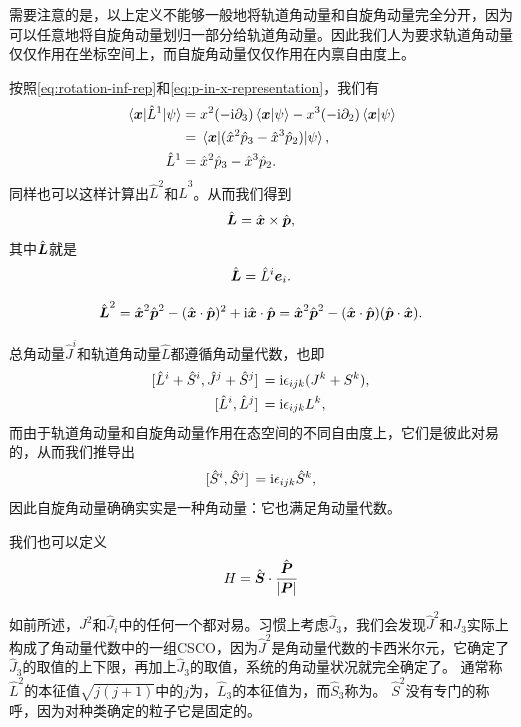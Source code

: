 需要注意的是，以上定义不能够一般地将轨道角动量和自旋角动量完全分开，因为可以任意地将自旋角动量划归一部分给轨道角动量。因此我们人为要求轨道角动量仅仅作用在坐标空间上，而自旋角动量仅仅作用在内禀自由度上。

按照\eqref{eq:rotation-inf-rep}和\eqref{eq:p-in-x-representation}，我们有
\[
    \begin{aligned}
        \mel{\vb*{x}}{\hat{L}^1}{\psi} &= x^2 (- \mathrm{i} \partial_3) \braket{\vb*{x}}{\psi} - x^3 (- \mathrm{i} \partial_2) \braket{\vb*{x}}{\psi} \\
        &= \mel{\vb*{x}}{(\hat{x}^2 \hat{p}_3 - \hat{x}^3 \hat{p}_2)}{\psi}, \\
        \hat{L}^1 &= \hat{x}^2 \hat{p}_3 - \hat{x}^3 \hat{p}_2.
    \end{aligned}
\]
同样也可以这样计算出$\hat{L}^2$和$\hat{L}^3$。从而我们得到
\begin{equation}
    \hat{\vb*{L}} = \hat{\vb*{x}} \times \hat{\vb*{p}},
\end{equation}
其中$\hat{\vb*{L}}$就是
\begin{equation}
    \hat{\vb*{L}} = \hat{L}^i \vb*{e}_i.
\end{equation}

\begin{equation}
    \hat{\vb*{L}}^2 = \hat{\vb*{x}}^2 \hat{\vb*{p}}^2 - (\hat{\vb*{x}} \cdot \hat{\vb*{p}})^2 + \mathrm{i} \hat{\vb*{x}} \cdot \hat{\vb*{p}} = \hat{\vb*{x}}^2 \hat{\vb*{p}}^2 - (\hat{\vb*{x}} \cdot \hat{\vb*{p}}) (\hat{\vb*{p}} \cdot \hat{\vb*{x}}).
\end{equation}

总角动量$\hat{J}^i$和轨道角动量$\hat{L}$都遵循角动量代数，也即
\[
    \begin{aligned}
        \comm*{\hat{L}^i+\hat{S}^i}{\hat{J}^j+\hat{S}^j} &= \ii \epsilon_{ijk} (J^k+S^k), \\
        \comm*{\hat{L}^i}{\hat{L}^j} &= \ii \epsilon_{ijk} L^k,
    \end{aligned}
\]
而由于轨道角动量和自旋角动量作用在态空间的不同自由度上，它们是彼此对易的，从而我们推导出
\[
    \comm*{\hat{S}^i}{\hat{S}^j} = \ii \epsilon_{ijk} \hat{S}^k,
\]
因此自旋角动量确确实实是一种角动量：它也满足角动量代数。

我们也可以定义
\begin{equation}
    H = \hat{\vb*{S}} \cdot \frac{\hat{\vb*{P}}}{\abs{\vb*{P}}}
\end{equation}

如前所述，$J^2$和$\hat{J}_i$中的任何一个都对易。习惯上考虑$\hat{J}_3$，我们会发现$\hat{J}^2$和$J_3$实际上构成了角动量代数中的一组CSCO，因为$\hat{J}^2$是角动量代数的卡西米尔元，它确定了$\hat{J}_3$的取值的上下限，再加上$\hat{J}_3$的取值，系统的角动量状况就完全确定了。
通常称$\hat{L}^2$的本征值$\sqrt{j(j+1)}$中的$j$为，$\hat{L}_3$的本征值为，而$\hat{S}_3$称为。
$\hat{S}^2$没有专门的称呼，因为对种类确定的粒子它是固定的。

